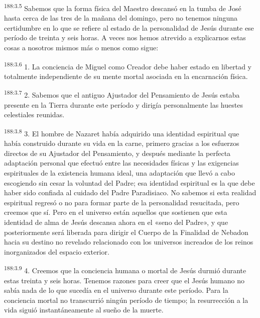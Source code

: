 \par 
\textsuperscript{188:3.5} Sabemos que la forma física del Maestro descansó en la tumba de José hasta cerca de las tres de la mañana del domingo, pero no tenemos ninguna certidumbre en lo que se refiere al estado de la personalidad de Jesús durante ese período de treinta y seis horas. A veces nos hemos atrevido a explicarnos estas cosas a nosotros mismos más o menos como sigue:

\par 
\textsuperscript{188:3.6} 1. La conciencia de Miguel como Creador debe haber estado en libertad y totalmente independiente de su mente mortal asociada en la encarnación física.

\par 
\textsuperscript{188:3.7} 2. Sabemos que el antiguo Ajustador del Pensamiento de Jesús estaba presente en la Tierra durante este período y dirigía personalmente las huestes celestiales reunidas.

\par 
\textsuperscript{188:3.8} 3. El hombre de Nazaret había adquirido una identidad espiritual que había construido durante su vida en la carne, primero gracias a los esfuerzos directos de su Ajustador del Pensamiento, y después mediante la perfecta adaptación personal que efectuó entre las necesidades físicas y las exigencias espirituales de la existencia humana ideal, una adaptación que llevó a cabo escogiendo sin cesar la voluntad del Padre; esa identidad espiritual es la que debe haber sido confiada al cuidado del Padre Paradisiaco. No sabemos si esta realidad espiritual regresó o no para formar parte de la personalidad resucitada, pero creemos que sí. Pero en el universo están aquellos que sostienen que esta identidad de alma de Jesús descansa ahora en el «seno del Padre», y que posteriormente será liberada para dirigir el Cuerpo de la Finalidad de Nebadon hacia su destino no revelado relacionado con los universos increados de los reinos inorganizados del espacio exterior.

\par 
\textsuperscript{188:3.9} 4. Creemos que la conciencia humana o mortal de Jesús durmió durante estas treinta y seis horas. Tenemos razones para creer que el Jesús humano no sabía nada de lo que sucedía en el universo durante este período. Para la conciencia mortal no transcurrió ningún período de tiempo; la resurrección a la vida siguió instantáneamente al sueño de la muerte.

